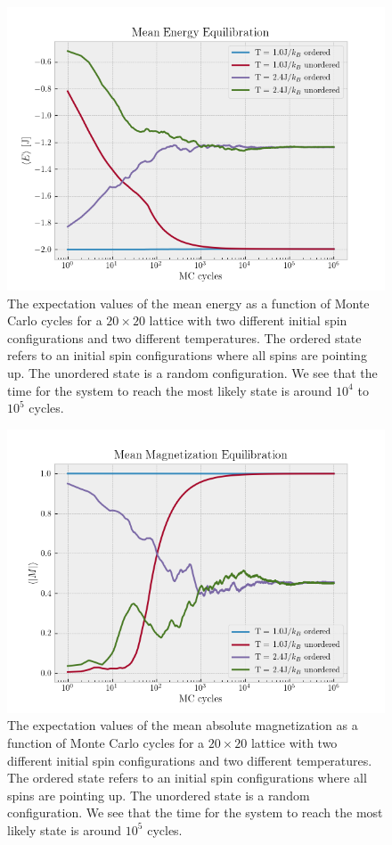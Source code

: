 \documentclass[%
reprint,
nofootinbib,
amsmath,amssymb,
aps,
]{revtex4-1}
\begin{document}
\begin{figure}
	\centering
	\includegraphics[width=0.95\linewidth]{./figures/Energy.png}
	\caption{The expectation values of the mean energy as a function of Monte Carlo cycles for a $20\times20$ lattice with two different initial spin configurations and two different temperatures. The ordered state refers to an initial spin configurations where all spins are pointing up. The unordered state is a random configuration. We see that the time for the system to reach the most likely state is around $10^4$ to $10^5$ cycles.}
	\label{fig:Energy}
\end{figure}
\begin{figure}
	\centering
	\includegraphics[width=0.95\linewidth]{./figures/Magnetization.png}
	\caption{The expectation values of the mean absolute magnetization as a function of Monte Carlo cycles for a $20\times20$ lattice with two different initial spin configurations and two different temperatures. The ordered state refers to an initial spin configurations where all spins are pointing up. The unordered state is a random configuration. We see that the time for the system to reach the most likely state is around $10^5$ cycles.}
	\label{fig:Magnetization}
\end{figure}
\end{document}
